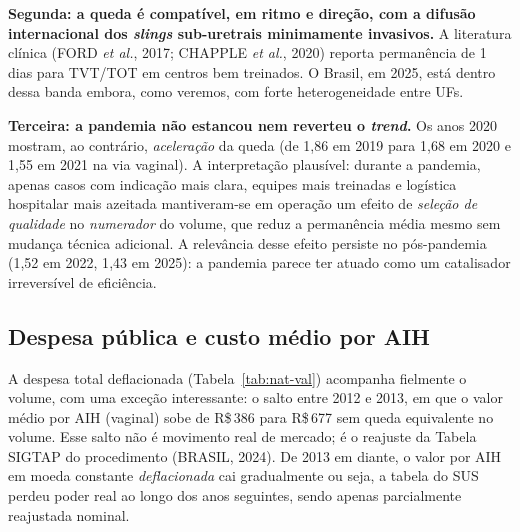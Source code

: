 \documentclass[12pt,a4paper,oneside]{article}
\newcommand{\rs}{R\$\,}
\begin{document}
\textbf{Segunda: a queda é compatível, em ritmo e direção, com
a difusão internacional dos \textit{slings} sub-uretrais
minimamente invasivos.} A literatura clínica (FORD \textit{et
al.}, 2017; CHAPPLE \textit{et al.}, 2020) reporta permanência
de 1 dias para TVT/TOT em centros bem treinados.
O Brasil, em 2025, está dentro dessa banda \textemdash{}
embora, como veremos, com forte heterogeneidade entre UFs.

\textbf{Terceira: a pandemia não estancou nem reverteu o
\textit{trend}.} Os anos 2020 mostram, ao
contrário, \textit{aceleração} da queda (de 1{,}86 em 2019 para
1{,}68 em 2020 e 1{,}55 em 2021 na via vaginal). A interpretação
plausível: durante a pandemia, apenas casos com indicação mais
clara, equipes mais treinadas e logística hospitalar mais
azeitada mantiveram-se em operação \textemdash{} um efeito de
\textit{seleção de qualidade} no \textit{numerador} do volume,
que reduz a permanência média mesmo sem mudança técnica adicional.
A relevância desse efeito persiste no pós-pandemia (1{,}52 em
2022, 1{,}43 em 2025): a pandemia parece ter atuado como um
catalisador irreversível de eficiência.

\subsection{Despesa pública e custo médio por AIH}\label{sub:despesa}

A despesa total deflacionada (Tabela~\ref{tab:nat-val}) acompanha
fielmente o volume, com uma exceção interessante: o salto entre
2012 e 2013, em que o valor médio por AIH (vaginal) sobe de
\rs 386 para \rs 677 sem queda equivalente no volume. Esse salto
não é movimento real de mercado; é o reajuste da Tabela SIGTAP
do procedimento (BRASIL, 2024). De 2013 em diante, o valor por
AIH em moeda constante \textit{deflacionada} cai gradualmente
\textemdash{} ou seja, a tabela do SUS perdeu poder real ao
longo dos anos seguintes, sendo apenas parcialmente reajustada
nominal.
\end{document}
